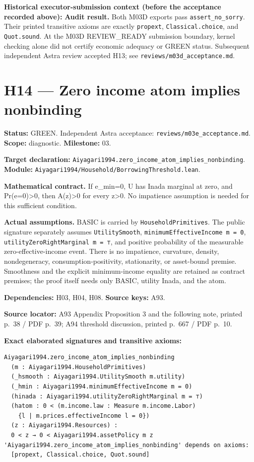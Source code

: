 \documentclass[
  11pt,
]{article}
\let\LedgerOriginalTexttt\texttt
\renewcommand{\texttt}[1]{{\small\LedgerOriginalTexttt{#1}}}
\begin{document}
\textbf{Historical executor-submission context (before the acceptance
recorded above):} \textbf{Audit result.} Both M03D exports pass
\texttt{assert\_no\_sorry}. Their printed transitive axioms are exactly
\texttt{propext}, \texttt{Classical.choice}, and \texttt{Quot.sound}. At
the M03D REVIEW\_READY submission boundary, kernel checking alone did
not certify economic adequacy or GREEN status. Subsequent independent
Astra review accepted H13; see \texttt{reviews/m03d\_acceptance.md}.

\section{H14 --- Zero income atom implies
nonbinding}\label{h14-zero-income-atom-implies-nonbinding}

\textbf{Status:} GREEN. Independent Astra acceptance:
\texttt{reviews/m03e\_acceptance.md}. \textbf{Scope:} diagnostic.
\textbf{Milestone:} 03.

\textbf{Target declaration:}
\texttt{Aiyagari1994.zero\_income\_atom\_implies\_nonbinding}.\\
\textbf{Module:}
\texttt{Aiyagari1994/Household/BorrowingThreshold.lean}.

\textbf{Mathematical contract.} If e\_min=0, U has Inada marginal at
zero, and Pr(e=0)\textgreater0, then A(z)\textgreater0 for every
z\textgreater0. No impatience assumption is needed for this sufficient
condition.

\textbf{Actual assumptions.} BASIC is carried by
\texttt{HouseholdPrimitives}. The public signature separately assumes
\texttt{UtilitySmooth}, \texttt{minimumEffectiveIncome\ m\ =\ 0},
\texttt{utilityZeroRightMarginal\ m\ =\ ⊤}, and positive probability of
the measurable zero-effective-income event. There is no impatience,
curvature, density, nondegeneracy, consumption-positivity, stationarity,
or asset-bound premise. Smoothness and the explicit minimum-income
equality are retained as contract premises; the proof itself needs only
BASIC, utility Inada, and the atom.

\textbf{Dependencies:} H03, H04, H08. \textbf{Source keys:} A93.

\textbf{Source locator:} A93 Appendix Proposition 3 and the following
note, printed p.~38 / PDF p.~39; A94 threshold discussion, printed
p.~667 / PDF p.~10.

\textbf{Exact elaborated signatures and transitive axioms:}

\begin{verbatim}
Aiyagari1994.zero_income_atom_implies_nonbinding
  (m : Aiyagari1994.HouseholdPrimitives)
  (_hsmooth : Aiyagari1994.UtilitySmooth m.utility)
  (_hmin : Aiyagari1994.minimumEffectiveIncome m = 0)
  (hinada : Aiyagari1994.utilityZeroRightMarginal m = ⊤)
  (hatom : 0 < (m.income.law : Measure m.income.Labor)
    {l | m.prices.effectiveIncome l = 0})
  (z : Aiyagari1994.Resources) :
  0 < z → 0 < Aiyagari1994.assetPolicy m z
'Aiyagari1994.zero_income_atom_implies_nonbinding' depends on axioms:
  [propext, Classical.choice, Quot.sound]
\end{verbatim}
\end{document}
